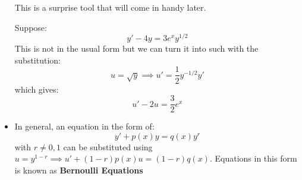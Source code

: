 \begin{itemize}
\begin{idea}
        This is a surprise tool that will come in handy later.
    \end{idea}
    \begin{example}
        Suppose:
        \begin{equation}
            y' - 4y = 3e^xy^{1/2}
            \label{eq:}
        \end{equation}
        This is not in the usual form but we can turn it into such with the substitution:
        \begin{equation}
            u = \sqrt{y} \implies u' = \frac{1}{2}y^{-1/2}y'
            \label{eq:}
        \end{equation}
        which gives:
        \begin{equation}
            u' - 2u = \frac{3}{2}e^x
            \label{eq:}
        \end{equation}
    \end{example}
    \item In general, an equation in the form of:
    \begin{equation}
        y' + p(x)y = q(x)y^r
        \label{eq:}
    \end{equation}
    with $r \neq 0,1$ can be substituted using $u=y^{1-r} \implies u'+(1-r)p(x)u = (1-r)q(x)$. Equations in this form is known as \textbf{Bernoulli Equations} 
\end{itemize}